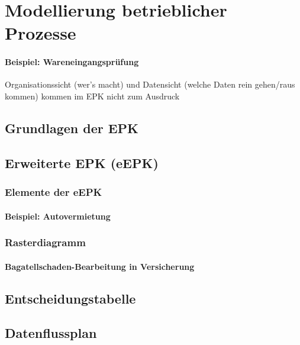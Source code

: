 \section{Modellierung betrieblicher Prozesse}
\paragraph{Beispiel: Wareneingangsprüfung}
Organisationssicht (wer's macht) und Datensicht (welche Daten rein gehen/raus kommen) kommen im EPK nicht zum Ausdruck
\subsection{Grundlagen der EPK}
\subsection{Erweiterte EPK (eEPK)}
\subsubsection{Elemente der eEPK}
\paragraph{Beispiel: Autovermietung}
\subsubsection{Rasterdiagramm}
\paragraph{Bagatellschaden-Bearbeitung in Versicherung}

\subsection{Entscheidungstabelle}

\subsection{Datenflussplan}



